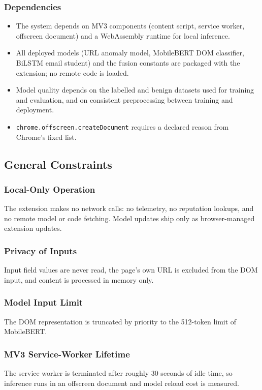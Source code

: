 \documentclass{FastFyp}
\begin{document}
\subsubsection{Dependencies}
\begin{itemize}
    \item The system depends on MV3 components (content script, service worker, offscreen document) and a WebAssembly runtime for local inference.
    \item All deployed models (URL anomaly model, MobileBERT DOM classifier, BiLSTM email student) and the fusion constants are packaged with the extension; no remote code is loaded.
    \item Model quality depends on the labelled and benign datasets used for training and evaluation, and on consistent preprocessing between training and deployment.
    \item \texttt{chrome.offscreen.createDocument} requires a declared reason from Chrome's fixed list.
\end{itemize}

\subsection{General Constraints}

\subsubsection{Local-Only Operation}
The extension makes no network calls: no telemetry, no reputation lookups, and no remote model or code fetching. Model updates ship only as browser-managed extension updates.

\subsubsection{Privacy of Inputs}
Input field values are never read, the page's own URL is excluded from the DOM input, and content is processed in memory only.

\subsubsection{Model Input Limit}
The DOM representation is truncated by priority to the 512-token limit of MobileBERT.

\subsubsection{MV3 Service-Worker Lifetime}
The service worker is terminated after roughly 30 seconds of idle time, so inference runs in an offscreen document and model reload cost is measured.
\end{document}
